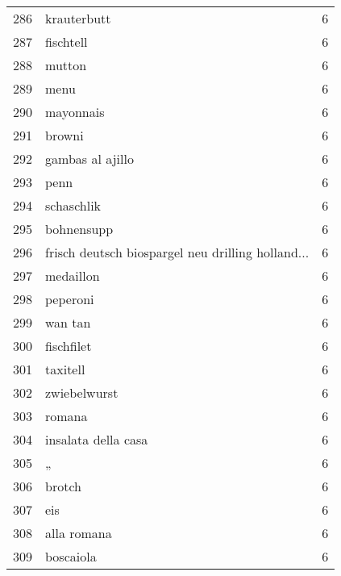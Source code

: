 \begin{tabular}{llr}
286  &                                        krauterbutt &      6 \\
287  &                                          fischtell &      6 \\
288  &                                             mutton &      6 \\
289  &                                               menu &      6 \\
290  &                                          mayonnais &      6 \\
291  &                                             browni &      6 \\
292  &                                   gambas al ajillo &      6 \\
293  &                                               penn &      6 \\
294  &                                         schaschlik &      6 \\
295  &                                         bohnensupp &      6 \\
296  &  frisch deutsch biospargel neu drilling holland... &      6 \\
297  &                                          medaillon &      6 \\
298  &                                           peperoni &      6 \\
299  &                                            wan tan &      6 \\
300  &                                         fischfilet &      6 \\
301  &                                           taxitell &      6 \\
302  &                                       zwiebelwurst &      6 \\
303  &                                             romana &      6 \\
304  &                                insalata della casa &      6 \\
305  &                                                  „ &      6 \\
306  &                                             brotch &      6 \\
307  &                                                eis &      6 \\
308  &                                        alla romana &      6 \\
309  &                                          boscaiola &      6 \\

\end{tabular}
